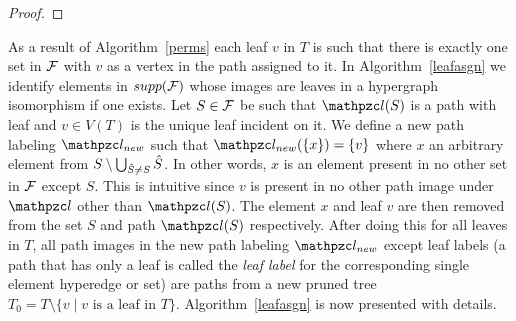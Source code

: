 \documentclass[MS]             %
              {iitmdiss_as}    %
\begin{document}
\begin{proof}
\end{proof}

As a result of Algorithm~\ref{perms} each leaf $v$ in $T$
is such that there is exactly one set in ${\cal F}$ with $v$ as a vertex in
the path assigned to it.  In Algorithm~\ref{leafasgn} we identify
elements in $supp({\cal F})$ whose images are leaves in a hypergraph
isomorphism if one exists.  Let $S \in {\cal F}$ be such that $\cl(S)$ is a
path with leaf and $v \in V(T)$ is the unique leaf incident on it.  We
define a new path labeling $\cl_{new}$ such that $\cl_{new}(\set{x}) =
\set{v}$ where $x$ an arbitrary element from $S \setminus \bigcup_{{\hat S}
  \ne S} {\hat S}$. In other words, $x$ is an element present in no other
set in ${\cal F}$ except $S$. This is intuitive since $v$ is present in no
other path image under $\cl$ other than $\cl(S)$.  The element $x$ and
leaf $v$ are then removed from the set $S$ and path $\cl(S)$
respectively. After doing this for all leaves in $T$, all path images
in the new path labeling $\cl_{new}$ except leaf labels (a path that
has only a leaf is called the {\em leaf label} for the corresponding
single element hyperedge or set) are paths from a new pruned tree $T_0
= T \setminus \{v \mid v \text{ is a leaf in }
T\}$. Algorithm~\ref{leafasgn} is now presented with details.
\end{document}
